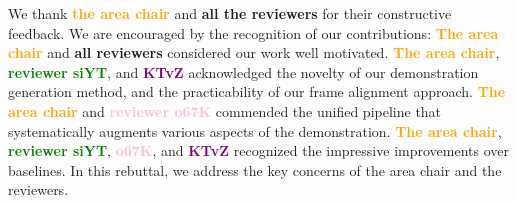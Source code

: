 \documentclass[conference]{IEEEtran}
\begin{document}


We thank \textbf{\textcolor{orange}{the area chair}} and \textbf{all the reviewers} for their constructive feedback.
We are encouraged by the recognition of our contributions:
\textbf{\textcolor{orange}{The area chair}} and \textbf{all reviewers} considered our work well motivated.
\textbf{\textcolor{orange}{The area chair}}, \textbf{\textcolor{green}{reviewer siYT}}, and \textbf{\textcolor{purple}{KTvZ}} acknowledged the novelty of our demonstration generation method, and the practicability of our frame alignment approach.
\textbf{\textcolor{orange}{The area chair}} and \textbf{\textcolor{pink}{reviewer o67K}} commended the unified pipeline that systematically augments various aspects of the demonstration.
\textbf{\textcolor{orange}{The area chair}}, \textbf{\textcolor{green}{reviewer siYT}}, \textbf{\textcolor{pink}{o67K}}, and \textbf{\textcolor{purple}{KTvZ}} recognized the impressive improvements over baselines.
In this rebuttal, we address the key concerns of the area chair and the reviewers. 

\end{document}

